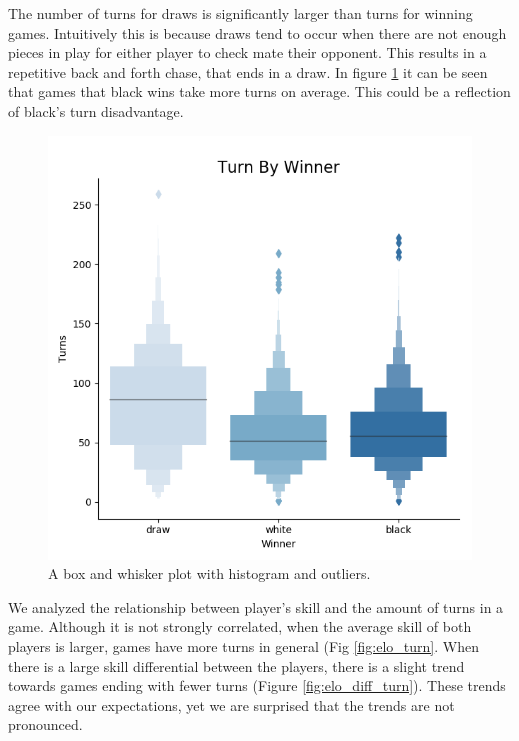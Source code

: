 \documentclass[reprint,
 amsmath,amssymb,nobibnotes,
 aps, floatfix]{revtex4-1}
\begin{document}
The number of turns for draws is significantly larger than turns for winning games. Intuitively this is because draws tend to occur when there are not enough pieces in play for either player to check mate their opponent. This results in a repetitive back and forth chase, that ends in a draw. In figure \ref{fig:draw} it can be seen that games that black wins take more turns on average. This could be a reflection of black's turn disadvantage.
\begin{figure}
    \centering
    \includegraphics[scale=.5]{image5.png}
    \caption{A box and whisker plot with histogram and outliers.}
    \label{fig:draw}
\end{figure}

We analyzed the relationship between player's skill and the amount of turns in a game. Although it is not strongly correlated, when the average skill of both players is larger, games have more turns in general (Fig \ref{fig:elo_turn}. When there is a large skill differential between the players, there is a slight trend towards games ending with fewer turns (Figure \ref{fig:elo_diff_turn}). These trends agree with our expectations, yet we are surprised that the trends are not pronounced. 
\end{document}
